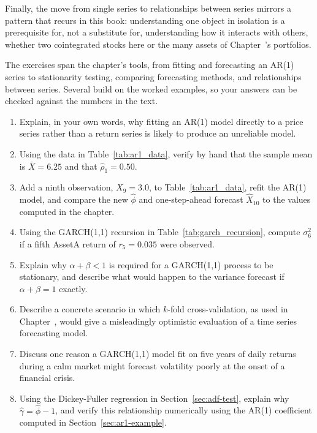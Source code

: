\documentclass[../ai_in_finance]{subfiles}
\begin{document}
Finally, the move from single series to relationships between series mirrors a pattern that recurs in this book: understanding one object in isolation is a prerequisite for, not a substitute for, understanding how it interacts with others, whether two cointegrated stocks here or the many assets of Chapter~'s portfolios.


The exercises span the chapter's tools, from fitting and forecasting an AR(1) series to stationarity testing, comparing forecasting methods, and relationships between series. Several build on the worked examples, so your answers can be checked against the numbers in the text.

\begin{enumerate}[exercises]
    \item Explain, in your own words, why fitting an AR(1) model directly to a price series rather than a return series is likely to produce an unreliable model.
    \item Using the data in Table~\ref{tab:ar1_data}, verify by hand that the sample mean is $\bar X = 6.25$ and that $\hat\rho_1 = 0.50$.
    \item Add a ninth observation, $X_9 = 3.0$, to Table~\ref{tab:ar1_data}, refit the AR(1) model, and compare the new $\hat\phi$ and one-step-ahead forecast $\hat X_{10}$ to the values computed in the chapter.
    \item Using the GARCH(1,1) recursion in Table~\ref{tab:garch_recursion}, compute $\sigma_6^2$ if a fifth AssetA return of $r_5 = 0.035$ were observed.
    \item Explain why $\alpha + \beta < 1$ is required for a GARCH(1,1) process to be stationary, and describe what would happen to the variance forecast if $\alpha + \beta = 1$ exactly.
    \item Describe a concrete scenario in which $k$-fold cross-validation, as used in Chapter~, would give a misleadingly optimistic evaluation of a time series forecasting model.
    \item Discuss one reason a GARCH(1,1) model fit on five years of daily returns during a calm market might forecast volatility poorly at the onset of a financial crisis.
    \item Using the Dickey-Fuller regression in Section~\ref{sec:adf-test}, explain why $\hat\gamma = \hat\phi - 1$, and verify this relationship numerically using the AR(1) coefficient computed in Section~\ref{sec:ar1-example}.

\end{enumerate}
\end{document}
